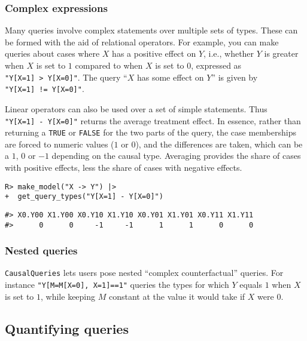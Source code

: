 \documentclass[
  11pt,
  article]{jss}
\begin{document}
\subsubsection{Complex expressions}\label{complex-expressions}

Many queries involve complex statements over multiple sets of types.
These can be formed with the aid of relational operators. For example,
you can make queries about cases where \(X\) has a positive effect on
\(Y\), i.e., whether \(Y\) is greater when \(X\) is set to \(1\)
compared to when \(X\) is set to \(0\), expressed as
\texttt{"Y{[}X=1{]}\ \textgreater{}\ Y{[}X=0{]}"}. The query ``\(X\) has
some effect on \(Y\)'' is given by
\texttt{"Y{[}X=1{]}\ !=\ Y{[}X=0{]}"}.

Linear operators can also be used over a set of simple statements. Thus
\texttt{"Y{[}X=1{]}\ -\ Y{[}X=0{]}"} returns the average treatment
effect. In essence, rather than returning a \texttt{TRUE} or
\texttt{FALSE} for the two parts of the query, the case memberships are
forced to numeric values (\(1\) or \(0\)), and the differences are
taken, which can be a \(1\), \(0\) or \(-1\) depending on the causal
type. Averaging provides the share of cases with positive effects, less
the share of cases with negative effects.

\begin{verbatim}
R> make_model("X -> Y") |> 
+  get_query_types("Y[X=1] - Y[X=0]")
\end{verbatim}

\begin{verbatim}
#> X0.Y00 X1.Y00 X0.Y10 X1.Y10 X0.Y01 X1.Y01 X0.Y11 X1.Y11 
#>      0      0     -1     -1      1      1      0      0
\end{verbatim}

\subsubsection{Nested queries}\label{nested-queries}

\texttt{CausalQueries} lets users pose nested ``complex counterfactual''
queries. For instance \texttt{"Y{[}M=M{[}X=0{]},\ X=1{]}==1"} queries
the types for which \(Y\) equals \(1\) when \(X\) is set to \(1\), while
keeping \(M\) constant at the value it would take if \(X\) were \(0\).

\subsection{Quantifying queries}\label{quantifying-queries}
\end{document}
